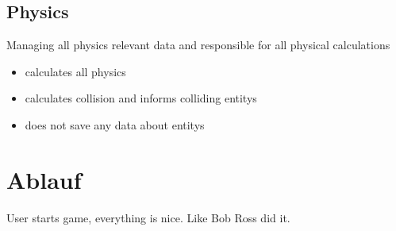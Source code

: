 \documentclass[parskip=full]{scrartcl}
\begin{document}
\subsection{Physics}
Managing all physics relevant data and responsible for all physical calculations
\begin{itemize}
	\item calculates all physics
	\item calculates collision and informs colliding entitys
	\item does not save any data about entitys
\end{itemize}
\section{Ablauf} %
User starts game, everything is nice. Like Bob Ross did it.
\end{document}
